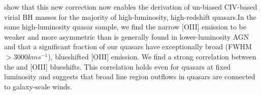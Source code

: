 \documentclass[a4paper,fleqn,usenatbib]{mnras}
\begin{document}
\citet{Coatman2017AAS} show that this new correction now enables the derivation of un-biased CIV-based virial BH masses for the majority of high-luminosity, high-redshift quasars.In the same high-luminosity quasar sample, we find the narrow [OIII] emission to be weaker and more asymmetric than is generally found in  lower-luminosity AGN and that a significant fraction of our quasars have exceptionally broad (FWHM $> 3000 km s^{-1}$), blueshifted [OIII] emission. We find a strong correlation between the \civ and [OIII] blueshifts. This correlation holds even for quasars at fixed
luminosity and suggests that broad line region outflows in quasars are
connected to galaxy-scale winds.
\end{document}
